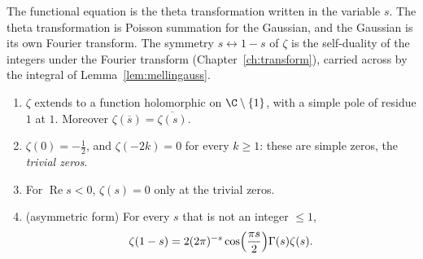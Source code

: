 \begin{beauty}
The functional equation is the theta transformation written in the variable $s$. The theta transformation is Poisson summation for the Gaussian, and the Gaussian is its own Fourier transform. The symmetry $s\leftrightarrow 1-s$ of $\zeta$ is the self-duality of the integers under the Fourier transform (Chapter~\ref{ch:transform}), carried across by the integral of Lemma~\ref{lem:mellingauss}.
\end{beauty}

\begin{corollary}\label{cor:zetaplane}
\begin{enumerate}[label=(\alph*)]
\item $\zeta$ extends to a function holomorphic on $\C\setminus\{1\}$, with a simple pole of residue $1$ at $1$. Moreover $\zeta(\overline s)=\overline{\zeta(s)}$.
\item $\zeta(0)=-\frac12$, and $\zeta(-2k)=0$ for every $k\ge1$: these are simple zeros, the \emph{trivial zeros}.
\item For $\operatorname{Re}s<0$, $\zeta(s)=0$ only at the trivial zeros.
\item (asymmetric form) For every $s$ that is not an integer $\le1$,
\[
\zeta(1-s)=2(2\pi)^{-s}\cos\Bigl(\frac{\pi s}2\Bigr)\Gamma(s)\zeta(s).
\]
\end{enumerate}
\end{corollary}
